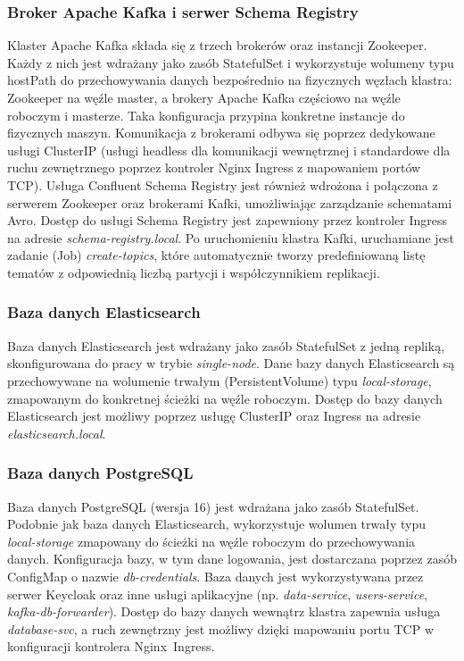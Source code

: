 \subsubsection{Broker Apache Kafka i serwer Schema Registry}
Klaster Apache Kafka składa się z trzech brokerów oraz instancji Zookeeper. Każdy z nich jest wdrażany jako zasób StatefulSet i wykorzystuje wolumeny typu hostPath do przechowywania danych bezpośrednio na fizycznych węzłach klastra: Zookeeper na węźle master, a brokery Apache Kafka częściowo na węźle roboczym i masterze. Taka konfiguracja przypina konkretne instancje do fizycznych maszyn. Komunikacja z brokerami odbywa się poprzez dedykowane usługi \mbox{ClusterIP} (usługi headless dla komunikacji wewnętrznej i standardowe dla ruchu zewnętrznego poprzez kontroler Nginx Ingress z mapowaniem portów TCP).
\newpage
Usługa Confluent Schema Registry jest również wdrożona i połączona z serwerem Zookeeper oraz brokerami Kafki, umożliwiając zarządzanie schematami Avro. Dostęp do usługi Schema Registry jest zapewniony przez kontroler Ingress na adresie \textit{schema-registry.local}. Po uruchomieniu klastra Kafki, uruchamiane jest zadanie (Job) \textit{create-topics}, które automatycznie tworzy predefiniowaną listę tematów z odpowiednią liczbą partycji i współczynnikiem replikacji.

\subsubsection{Baza danych Elasticsearch}
Baza danych Elasticsearch jest wdrażany jako zasób StatefulSet z jedną repliką, skonfigurowana do pracy w trybie \textit{single-node}. Dane bazy danych Elasticsearch są przechowywane na wolumenie trwałym (PersistentVolume) typu \textit{local-storage}, zmapowanym do konkretnej ścieżki na węźle roboczym. Dostęp do bazy danych Elasticsearch jest możliwy poprzez usługę ClusterIP oraz Ingress na adresie \textit{elasticsearch.local}.

\subsubsection{Baza danych PostgreSQL}
Baza danych PostgreSQL (wersja 16) jest wdrażana jako zasób StatefulSet. Podobnie jak baza danych Elasticsearch, wykorzystuje wolumen trwały typu \textit{local-storage} zmapowany do ścieżki na węźle roboczym do przechowywania danych. Konfiguracja bazy, w tym dane logowania, jest dostarczana poprzez zasób \mbox{ConfigMap} o nazwie \textit{db-credentials}. Baza danych jest wykorzystywana przez serwer Keycloak oraz inne usługi aplikacyjne (np. \textit{data-service}, \textit{users-service}, \textit{kafka-db-forwarder}). Dostęp do bazy danych wewnątrz klastra zapewnia usługa \textit{database-svc}, a ruch zewnętrzny jest możliwy dzięki mapowaniu portu TCP w konfiguracji kontrolera \mbox{Nginx Ingress}.

